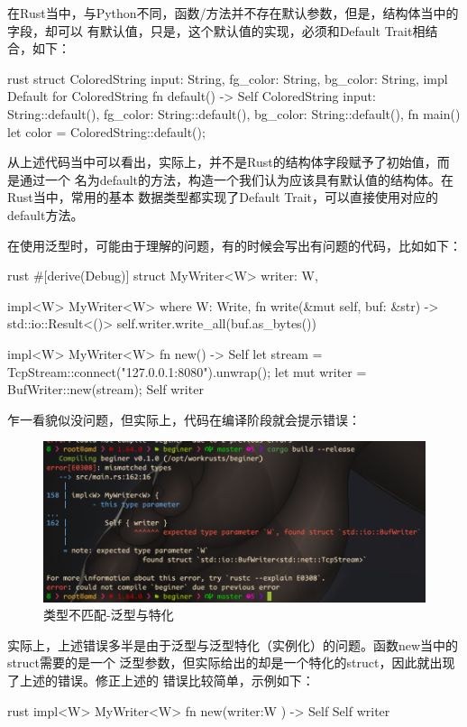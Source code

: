 在Rust当中，与Python不同，函数/方法并不存在默认参数，但是，结构体当中的字段，却可以
有默认值，只是，这个默认值的实现，必须和Default Trait相结合，如下：
\begin{code-block}{rust}
struct ColoredString {
    input: String,
    fg_color: String,
    bg_color: String,
}
impl Default for ColoredString {
    fn default() -> Self {
        ColoredString {
            input: String::default(),
            fg_color: String::default(),
            bg_color: String::default(),
        }
    }
}
fn main() {
    let color = ColoredString::default();
}
\end{code-block}
从上述代码当中可以看出，实际上，并不是Rust的结构体字段赋予了初始值，而是通过一个
名为default的方法，构造一个我们认为应该具有默认值的结构体。在Rust当中，常用的基本
数据类型都实现了Default Trait，可以直接使用对应的default方法。

在使用泛型时，可能由于理解的问题，有的时候会写出有问题的代码，比如如下：
\begin{code-block}{rust}
#[derive(Debug)]
struct MyWriter<W> {
    writer: W,
}

impl<W> MyWriter<W>
where
    W: Write,
{
    fn write(&mut self, buf: &str) -> std::io::Result<()> {
       self.writer.write_all(buf.as_bytes())
    }
}

impl<W> MyWriter<W> {
    fn new() -> Self {
       let stream = TcpStream::connect("127.0.0.1:8080").unwrap();
       let mut writer = BufWriter::new(stream);
       Self { writer }
    }
}
\end{code-block}
乍一看貌似没问题，但实际上，代码在编译阶段就会提示错误：
\begin{figure}[H]
  \centering
  \includegraphics[width=\linewidth]{rust_type_error.png}
  \caption{类型不匹配-泛型与特化}
  \label{fig:rust_type_error}
\end{figure}
实际上，上述错误多半是由于泛型与泛型特化（实例化）的问题。函数new当中的struct需要的是一个
泛型参数，但实际给出的却是一个特化的struct，因此就出现了上述的错误。修正上述的
错误比较简单，示例如下：
\begin{code-block}{rust}
impl<W> MyWriter<W> {
    fn new(writer:W ) -> Self {
       Self { writer }
    }
}
\end{code-block}

